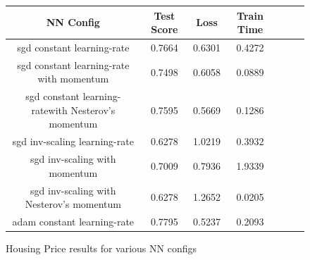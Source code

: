 \documentclass[h]{article}
\begin{document}
\begin{figure}[H]
\begin{tabular}{ | c | c  | c | c | c | c | c |} 
\hline
\textbf{NN Config} & \textbf{Test Score} & \textbf{Loss} & \textbf{Train Time}   \\ 
\hline
sgd constant learning-rate & 0.7664 & 0.6301 & 0.4272  \\ \hline
sgd constant learning-rate with momentum & 0.7498 & 0.6058 & 0.0889 \\ \hline
sgd constant  learning-ratewith Nesterov's momentum & 0.7595 & 0.5669 & 0.1286 \\ \hline
sgd inv-scaling learning-rate & 0.6278 & 1.0219 & 0.3932  \\ \hline
sgd inv-scaling with momentum & 0.7009 & 0.7936 & 1.9339  \\ \hline
sgd inv-scaling with Nesterov's momentum & 0.6278 & 1.2652 & 0.0205  \\ \hline
adam constant  learning-rate  & 0.7795 & 0.5237 & 0.2093  \\ \hline
\end{tabular}
\caption*{Housing Price results for various NN configs}
\endminipage\hfill
\end{figure}
\end{document}
